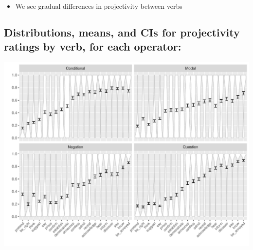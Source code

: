 \documentclass[10pt]{article}\usepackage[]{graphicx}\usepackage[dvipsnames]{xcolor}
\newenvironment{knitrout}{}{} %
\begin{document}
\begin{itemize}
  \item We see gradual differences in projectivity between verbs
\end{itemize}

\newpage
\subsection{Distributions, means, and CIs for projectivity ratings by verb, for each operator:}
\begin{knitrout}
\color{fgcolor}

{\centering \includegraphics[width=\linewidth]{figures/summary-combined-1-1} 

}


\end{knitrout}
 
\newpage
\end{document}
